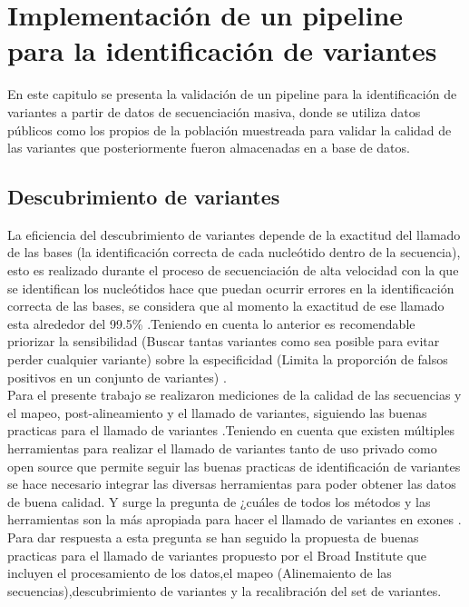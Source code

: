 \chapter{Implementación de un pipeline para la identificación de variantes}

En este capitulo se presenta la validación de un pipeline para la identificación de variantes a partir de datos de secuenciación masiva, donde se utiliza datos públicos como los propios de la población muestreada para validar la calidad  de las variantes que posteriormente fueron almacenadas en a base de datos.

\section{Descubrimiento de variantes}

La eficiencia del descubrimiento de variantes depende de la exactitud del llamado de las bases (la identificación correcta de cada nucleótido dentro de la secuencia), esto es realizado durante el proceso de secuenciación de alta velocidad con la que se identifican los nucleótidos hace que puedan ocurrir errores en la identificación correcta de las bases, se considera que al momento la exactitud de ese llamado esta alrededor del 99.5\% \cite{Tetreault2015}.Teniendo en cuenta lo anterior es recomendable  priorizar la sensibilidad (Buscar tantas variantes como sea posible para evitar perder cualquier variante) sobre la especificidad (Limita la proporción de falsos positivos en un conjunto de variantes) \cite{Auwera2014}.  \\

Para el presente trabajo se realizaron mediciones de la calidad de las secuencias y el mapeo, post-alineamiento y el llamado de variantes, siguiendo las buenas practicas para el llamado de variantes \cite{Fisch2015}.Teniendo en cuenta que existen múltiples herramientas para realizar el llamado de variantes tanto de uso privado como open source que permite  seguir las buenas practicas de identificación de variantes se hace necesario integrar las diversas herramientas para poder obtener las datos de buena calidad. Y surge la pregunta de ¿cuáles de todos los métodos y las herramientas son la más apropiada para hacer el llamado de variantes en exones \cite{Bao2014}\cite{Cornish2015}.\\

Para dar respuesta a esta pregunta se han seguido la propuesta de buenas practicas para el llamado de variantes propuesto por el Broad Institute que incluyen el procesamiento de los datos,el mapeo (Alinemaiento de las secuencias),descubrimiento de variantes y la recalibración del set de variantes.

